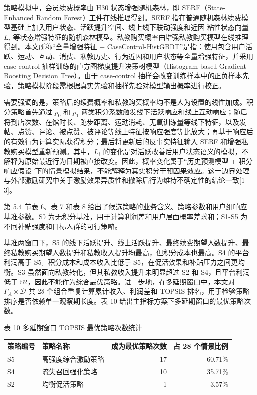 \documentclass[
  12pt,
]{ctexart}
\begin{document}
策略模拟中，会员续费概率由 H30 状态增强随机森林，即 SERF（State-Enhanced Random Forest）工件在线推理得到。SERF 指在普通随机森林续费模型基础上加入用户状态、活跃提升空间、线上线下联动强度和近因-粘性状态向量 \(L_i\) 等状态增强特征的随机森林模型。私教购买概率由增强私教购买模型在线推理得到。本文所称``全量增强特征 + CaseControl-HistGBDT''是指：使用包含用户活跃、运动、互动、消费、私教历史、行为近因和用户状态等全量增强特征，并采用 case-control 抽样训练的直方图梯度提升决策树模型（Histogram-based Gradient Boosting Decision Tree）。由于 case-control 抽样会改变训练样本中的正负样本先验，策略模拟阶段需根据真实先验和抽样先验对模型输出概率进行校正。

需要强调的是，策略后的续费概率和私教购买概率均不是人为设置的线性加成。积分策略首先通过 \(p_0\) 和 \(p_1\) 两类积分系数触发线下活跃响应和线上互动响应；随后将到店次数、在馆时长、跑步距离、运动消耗、无氧训练量等线下特征，以及发帖、点赞、评论、被点赞、被评论等线上特征按响应强度等比放大；再基于响应后的有效行为计算实际获得积分；最后将更新后的反事实特征输入 SERF 和增强私教购买模型重新预测。其中，\(L_i\) 的变化是对活跃改善后用户状态语义的模拟，不解释为原始最近行为日期被直接改变。因此，概率变化属于``历史预测模型 + 积分响应假设''下的情景模拟结果，不能解释为真实积分干预因果效应。这一边界处理与外部激励研究中关于激励效果异质性和撤除后行为维持不确定性的结论一致{[}1-3{]}。

第 5.4 节表 6、表 7 和表 8 给出了候选策略的业务含义、策略参数和用户组响应基准参数。S0 为无积分基准，用于计算利润差和用户层面概率差求和；S1-S5 为不同补贴强度和目标人群的可行策略。

基准两窗口下，S5 的线下活跃提升、线上活跃提升、最终续费期望人数提升、最终私教购买期望人数提升和私教收入提升均最高，但积分成本也最高。S4 的平台利润高于 S5，积分成本和成本收入比低于 S5，在促活效果和补贴压力之间更均衡。S3 虽然面向私教转化，但其私教收入提升未明显超过 S2 和 S4，且平台利润低于 S2，因此不能作为综合最优策略。进一步地，在多延期窗口中，本文对 \(\Gamma_A\times\mathcal{D}\) 共 28 个组合重复计算累计收入、利润差和 TOPSIS 排名，用于检验策略排序是否依赖单一观察期长度。表 10 给出主指标方案下多延期窗口的最优策略次数。

\begin{center}\small 表 10 多延期窗口 TOPSIS 最优策略次数统计\end{center}

\begin{longtable}[]{@{}llrr@{}}
\toprule
策略编号 & 策略名称 & 成为最优策略次数 & 占 28 个情景比例 \\
\midrule
\endhead
S5 & 高强度综合激励策略 & 17 & 60.71\% \\
S4 & 流失召回强化策略 & 10 & 35.71\% \\
S2 & 均衡促活策略 & 1 & 3.57\% \\
\bottomrule
\end{longtable}
\end{document}
